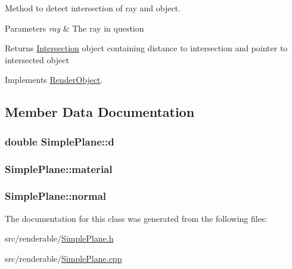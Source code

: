 Method to detect intersection of ray and object. 


\begin{DoxyParams}{Parameters}
{\em ray} & The ray in question \\
\hline
\end{DoxyParams}
\begin{DoxyReturn}{Returns}
\hyperlink{classIntersection}{Intersection} object containing distance to intersection and pointer to intersected object 
\end{DoxyReturn}


Implements \hyperlink{classRenderObject_aa844ad2c5ef0c2b79faef2ed0af553bb}{Render\+Object}.



\subsection{Member Data Documentation}
\subsubsection[{\texorpdfstring{d}{d}}]{\setlength{\rightskip}{0pt plus 5cm}double Simple\+Plane\+::d\hspace{0.3cm}{\ttfamily [private]}}\hypertarget{classSimplePlane_a84850a97b34a8616c7ffdd51c30a5dc9}{}\label{classSimplePlane_a84850a97b34a8616c7ffdd51c30a5dc9}
\subsubsection[{\texorpdfstring{material}{material}}]{ Simple\+Plane\+::material\hspace{0.3cm}{\ttfamily [private]}}\hypertarget{classSimplePlane_a04307eae806daa2cd2f1c471224b44cf}{}\label{classSimplePlane_a04307eae806daa2cd2f1c471224b44cf}
\subsubsection[{\texorpdfstring{normal}{normal}}]{ Simple\+Plane\+::normal\hspace{0.3cm}{\ttfamily [private]}}\hypertarget{classSimplePlane_a222f5d12aed966bc2764abc90b622037}{}\label{classSimplePlane_a222f5d12aed966bc2764abc90b622037}


The documentation for this class was generated from the following files\+:\begin{DoxyCompactItemize}
\item 
src/renderable/\hyperlink{SimplePlane_8h}{Simple\+Plane.\+h}\item 
src/renderable/\hyperlink{SimplePlane_8cpp}{Simple\+Plane.\+cpp}\end{DoxyCompactItemize}
